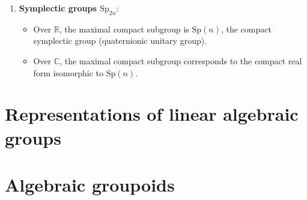 \begin{example}
\begin{enumerate}
    \item \textbf{Symplectic groups \(\mathrm{Sp}_{2n}\)}:
    \begin{itemize}
        \item Over \(\mathbb{R}\), the maximal compact subgroup is \(\mathrm{Sp}(n)\), the compact symplectic group (quaternionic unitary group).
        \item Over \(\mathbb{C}\), the maximal compact subgroup corresponds to the compact real form isomorphic to \(\mathrm{Sp}(n)\).
    \end{itemize}
\end{enumerate}
\end{example}

\section{Representations of linear algebraic groups}






\section{Algebraic groupoids}




















